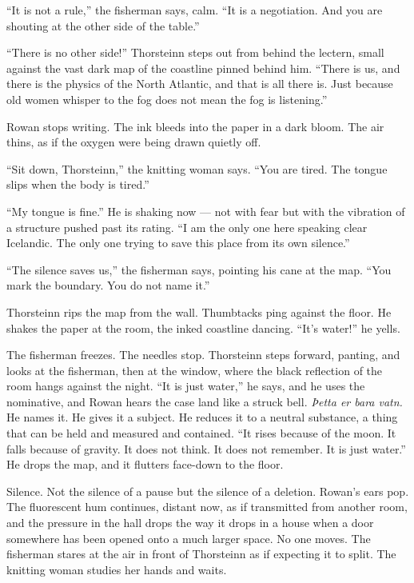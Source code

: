 \documentclass[11pt,oneside]{book}
\begin{document}
``It is not a rule,'' the fisherman says, calm. ``It is a negotiation.
And you are shouting at the other side of the table.''

``There is no other side!'' Thorsteinn steps out from behind the
lectern, small against the vast dark map of the coastline pinned behind
him. ``There is us, and there is the physics of the North Atlantic, and
that is all there is. Just because old women whisper to the fog does not
mean the fog is listening.''

Rowan stops writing. The ink bleeds into the paper in a dark bloom. The
air thins, as if the oxygen were being drawn quietly off.

``Sit down, Thorsteinn,'' the knitting woman says. ``You are tired. The
tongue slips when the body is tired.''

``My tongue is fine.'' He is shaking now --- not with fear but with the
vibration of a structure pushed past its rating. ``I am the only one
here speaking clear Icelandic. The only one trying to save this place
from its own silence.''

``The silence saves us,'' the fisherman says, pointing his cane at the
map. ``You mark the boundary. You do not name it.''

Thorsteinn rips the map from the wall. Thumbtacks ping against the
floor. He shakes the paper at the room, the inked coastline dancing.
``It's water!'' he yells.

The fisherman freezes. The needles stop. Thorsteinn steps forward,
panting, and looks at the fisherman, then at the window, where the black
reflection of the room hangs against the night. ``It is just water,'' he
says, and he uses the nominative, and Rowan hears the case land like a
struck bell. \emph{Þetta er bara vatn.} He names it. He gives it a
subject. He reduces it to a neutral substance, a thing that can be held
and measured and contained. ``It rises because of the moon. It falls
because of gravity. It does not think. It does not remember. It is just
water.'' He drops the map, and it flutters face-down to the floor.

Silence. Not the silence of a pause but the silence of a deletion.
Rowan's ears pop. The fluorescent hum continues, distant now, as if
transmitted from another room, and the pressure in the hall drops the
way it drops in a house when a door somewhere has been opened onto a
much larger space. No one moves. The fisherman stares at the air in
front of Thorsteinn as if expecting it to split. The knitting woman
studies her hands and waits.
\end{document}

